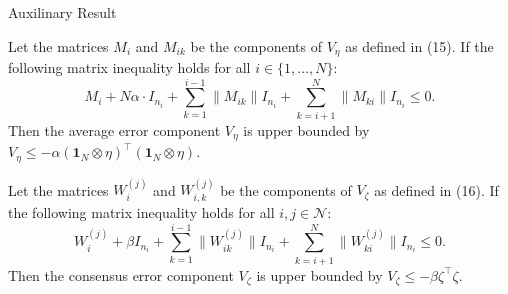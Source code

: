 \begin{frame}{Auxilinary Result}

    \begin{proposition}\footnotesize
        \label{prop:Veta}
            Let the matrices $M_i$ and $M_{ik}$ be the components of $V_\eta$ as defined in (15). If the following matrix inequality holds for all $i \in \{1, \dots, N\}$:
        \begin{equation}
        M_i+N\alpha\cdot I_{n_i} + \sum_{k=1}^{i-1} \big\|M_{ik}\big\| I_{n_i} + \sum_{k=i+1}^{N} \big\|M_{ki}\big\| I_{n_i} \le 0.
        \label{eq:prop eta}
        \end{equation}
        Then the average error component $V_\eta$ is upper bounded by $V_\eta \le -\alpha(\mathbf{1}_N\otimes\eta)^\top(\mathbf{1}_N\otimes\eta)$.    
    \end{proposition}

    \begin{proposition}\footnotesize
        \label{prop:Vzeta}
            Let the matrices $W_i^{(j)}$ and $W_{i,k}^{(j)}$ be the components of $V_\zeta$ as defined in (16). If the following matrix inequality holds for all $i, j \in \mathcal{N}$:
        \begin{equation}
        W_i^{(j)}+\beta I_{n_i} + \sum_{k=1}^{i-1} \big\|W_{ik}^{(j)}\big\| I_{n_i} + \sum_{k=i+1}^{N} \big\|W_{ki}^{(j)}\big\| I_{n_i} \le 0.
        \label{eq:prop zeta}
        \end{equation}
        Then the consensus error component $V_\zeta$ is upper bounded by $V_\zeta \le -\beta\zeta^\top\zeta$.
    \end{proposition}
\end{frame}





